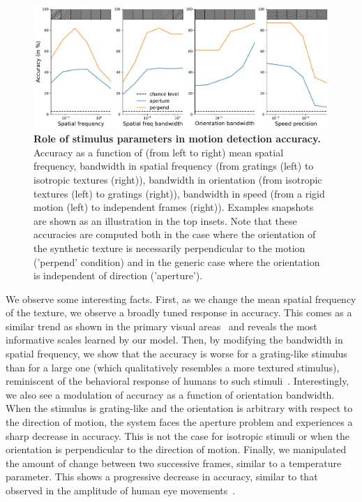 \documentclass[default]{sn-jnl}%
\theoremstyle{thmstyleone}%
\theoremstyle{thmstyletwo}%
\theoremstyle{thmstylethree}%
\begin{document}
\begin{figure}%
    \centering
    \includegraphics[width=0.99\linewidth]{figures/motion_clouds.pdf} %
    \caption{{\bf Role of stimulus parameters in motion detection accuracy.} Accuracy as a function of (from left to right) mean spatial frequency, bandwidth in spatial frequency (from gratings (left) to isotropic textures (right)), bandwidth in orientation (from isotropic textures (left) to gratings (right)), bandwidth in speed (from a rigid motion (left) to independent frames (right)). Examples snapshots are shown as an illustration in the top insets. Note that these accuracies are computed both in the case where the orientation of the synthetic texture is necessarily perpendicular to the motion ('perpend' condition) and in the generic case where the orientation is independent of direction ('aperture').
    }
    \label{fig:motion_clouds}
\end{figure}
We observe some interesting facts. First, as we change the mean spatial frequency of the texture, we observe a broadly tuned response in accuracy. This comes as a similar trend as shown in the primary visual areas~\citep{priebe_tuning_2006,Perrinet2007} and reveals the most informative scales learned by our model. Then, by modifying the bandwidth in spatial frequency, we show that the accuracy is worse for a grating-like stimulus than for a large one (which qualitatively resembles a more textured stimulus), reminiscent of the behavioral response of humans to such stimuli~\citep{simoncini_more_2012, ravello_speed-selectivity_2019}. Interestingly, we also see a modulation of accuracy as a function of orientation bandwidth. When the stimulus is grating-like and the orientation is arbitrary with respect to the direction of motion, the system faces the aperture problem and experiences a sharp decrease in accuracy. This is not the case for isotropic stimuli or when the orientation is perpendicular to the direction of motion. Finally, we manipulated the amount of change between two successive frames, similar to a temperature parameter. This shows a progressive decrease in accuracy, similar to that observed in the amplitude of human eye movements~\citep{mansour_pour_speed_2018}.
%
\end{document}
